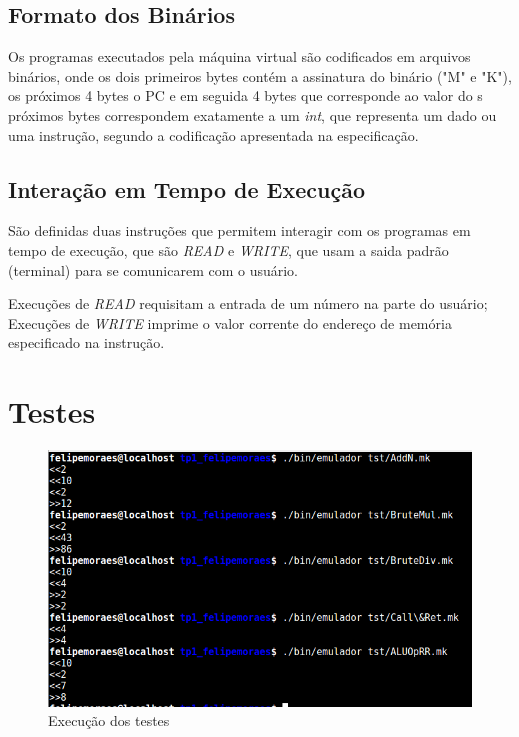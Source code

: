 \documentclass[12pt, a4paper]{article}
\begin{document}
\subsection{Formato dos Binários}

Os programas executados pela máquina virtual são codificados em arquivos binários, onde os dois primeiros bytes contém a assinatura do binário ("M" e "K"), os próximos 4 bytes o PC e em seguida 4 bytes que corresponde ao valor do s próximos bytes correspondem exatamente a um \emph{int}, que representa um dado ou uma instrução, segundo a codificação apresentada na especificação.

\subsection{Interação em Tempo de Execução}

São definidas duas instruções que permitem interagir com os programas em tempo de execução, que são \emph{READ} e \emph{WRITE}, que usam a saida padrão (terminal) para se comunicarem com o usuário.

Execuções de \emph{READ} requisitam a entrada de um número na parte do usuário; Execuções de \emph{WRITE} imprime o valor corrente do endereço de memória especificado na instrução. 

\section{Testes}

\begin{figure}
\centering
\includegraphics[width=1.1\textwidth]{RuntimeScreencap.png}
\caption{Execução dos testes}
\label{FigureExecution}
\end{figure}
\end{document}
